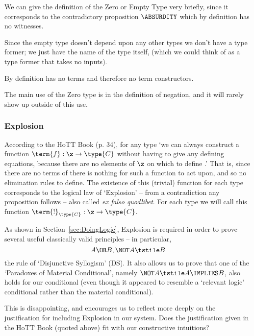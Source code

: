 We can give the definition of the Zero or Empty Type very briefly, since it corresponds to the contradictory proposition $\ABSURDITY$ which by definition has no witnesses.

Since the empty type doesn't depend upon any other types we don't have a type former; we just have the name of the type itself,  (which we could think of as a type former that takes no inputs).

By definition  has no terms and therefore no term constructors.

The main use of the Zero type is in the definition of negation, and it will rarely show up outside of this use.




\subsubsection{Explosion}

According to the HoTT Book (p. 34), for any type  `we can always construct a function 
$\term{f}:\z \to \type{C}$ 
without having to give any defining equations, because there are no elements of $\z$ on which to define .' That is, since there are no terms of  there is nothing for such a function to act upon, and so no elimination rules to define. The existence of this (trivial) function for each type corresponds to the logical law of `Explosion' -- from a contradiction any proposition follows -- also called \emph{ex falso quodlibet}. For each type  we will call this function $\term{!}_{\type{C}}:\z \to \type{C}$.

As shown in Section~\ref{sec:DoingLogic},
Explosion is required in order to prove several useful classically valid principles -- in particular, 
\[
A \OR B, \NOT A \tstile B
\] 
the rule of `Disjunctive Syllogism' (DS).%
It also allows us to prove that one of the `Paradoxes of Material Conditional', namely 
$\NOT A \tstile A \IMPLIES B$, also holds for our conditional (even though it appeared to resemble a `relevant logic' conditional rather than the material conditional).

This is disappointing, and encourages us to reflect more deeply on the justification for including Explosion in our system.  Does the justification given in the HoTT Book (quoted above) fit with our constructive intuitions?  

